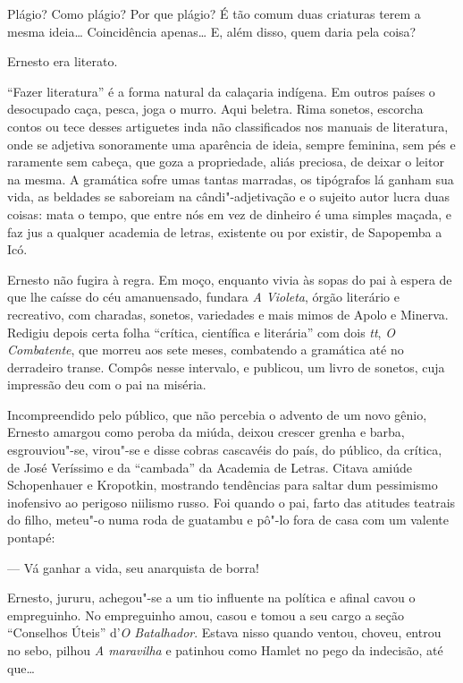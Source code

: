 Plágio? Como plágio? Por que plágio? É tão comum duas criaturas terem a
mesma ideia\ldots{} Coincidência apenas\ldots{} E, além disso, quem daria pela
coisa?

Ernesto era literato.

``Fazer literatura'' é a forma natural da calaçaria indígena. Em outros
países o desocupado caça, pesca, joga o murro. Aqui beletra. Rima
sonetos, escorcha contos ou tece desses artiguetes inda não
classificados nos manuais de literatura, onde se adjetiva sonoramente
uma aparência de ideia, sempre feminina, sem pés e raramente sem cabeça,
que goza a propriedade, aliás preciosa, de deixar o leitor na mesma. A
gramática sofre umas tantas marradas, os tipógrafos lá ganham sua vida,
as beldades se saboreiam na cândi"-adjetivação e o sujeito autor lucra
duas coisas: mata o tempo, que entre nós em vez de dinheiro é uma
simples maçada, e faz jus a qualquer academia de letras, existente ou
por existir, de Sapopemba a Icó.

Ernesto não fugira à regra. Em moço, enquanto vivia às sopas do pai à
espera de que lhe caísse do céu amanuensado, fundara \emph{A Violeta},
órgão literário e recreativo, com charadas, sonetos, variedades e mais
mimos de Apolo e Minerva. Redigiu depois certa folha ``crítica,
científica e literária'' com dois \emph{tt}, \emph{O Combatente}, que
morreu aos sete meses, combatendo a gramática até no derradeiro transe.
Compôs nesse intervalo, e publicou, um livro de sonetos, cuja impressão
deu com o pai na miséria.

Incompreendido pelo público, que não percebia o advento de um novo
gênio, Ernesto amargou como peroba da miúda, deixou crescer grenha e
barba, esgrouviou"-se, virou"-se e disse cobras cascavéis do país, do
público, da crítica, de José Veríssimo e da ``cambada'' da Academia de
Letras. Citava amiúde Schopenhauer e Kropotkin, mostrando tendências
para saltar dum pessimismo inofensivo ao perigoso niilismo russo. Foi
quando o pai, farto das atitudes teatrais do filho, meteu"-o numa roda de
guatambu e pô"-lo fora de casa com um valente pontapé:

--- Vá ganhar a vida, seu anarquista de borra!

Ernesto, jururu, achegou"-se a um tio influente na política e afinal
cavou o empreguinho. No empreguinho amou, casou e tomou a seu cargo a
seção ``Conselhos Úteis'' d'\emph{O Batalhador}. Estava nisso quando
ventou, choveu, entrou no sebo, pilhou \emph{A maravilha} e patinhou
como Hamlet no pego da indecisão, até que\ldots{}

